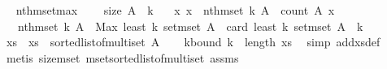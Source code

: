 \begin{isabellebody}
\isamarkupfalse%
%
\endisatagproof
{\isafoldproof}%
%
\isadelimproof
\ \isanewline
%
\endisadelimproof
\isanewline
{}\isamarkupfalse%
\ nth{\isacharunderscore}{\kern0pt}mset{\isacharunderscore}{\kern0pt}max{\isacharcolon}{\kern0pt}\ \isanewline
\ \ \ {\isachardoublequoteopen}size\ A\ {\isachargreater}{\kern0pt}\ k{\isachardoublequoteclose}\isanewline
\ \ \ {\isachardoublequoteopen}{\isasymAnd}x{\isachardot}{\kern0pt}\ x\ {\isasymle}\ nth{\isacharunderscore}{\kern0pt}mset\ k\ A\ {\isasymLongrightarrow}\ count\ A\ x\ {\isasymle}\ {}{\isachardoublequoteclose}\isanewline
\ \ \ {\isachardoublequoteopen}nth{\isacharunderscore}{\kern0pt}mset\ k\ A\ {\isacharequal}{\kern0pt}\ Max\ {\isacharparenleft}{\kern0pt}least\ {\isacharparenleft}{\kern0pt}k{\isacharplus}{\kern0pt}{}{\isacharparenright}{\kern0pt}\ {\isacharparenleft}{\kern0pt}set{\isacharunderscore}{\kern0pt}mset\ A{\isacharparenright}{\kern0pt}{\isacharparenright}{\kern0pt}{\isachardoublequoteclose}\ \ {\isachardoublequoteopen}card\ {\isacharparenleft}{\kern0pt}least\ {\isacharparenleft}{\kern0pt}k{\isacharplus}{\kern0pt}{}{\isacharparenright}{\kern0pt}\ {\isacharparenleft}{\kern0pt}set{\isacharunderscore}{\kern0pt}mset\ A{\isacharparenright}{\kern0pt}{\isacharparenright}{\kern0pt}\ {\isacharequal}{\kern0pt}\ k{\isacharplus}{\kern0pt}{}{\isachardoublequoteclose}\isanewline
%
\isadelimproof
%
\endisadelimproof
%
\isatagproof
{}\isamarkupfalse%
\ {\isacharminus}{\kern0pt}\isanewline
\ \ \isamarkupfalse%
\ xs\ \ {\isachardoublequoteopen}xs\ {\isacharequal}{\kern0pt}\ sorted{\isacharunderscore}{\kern0pt}list{\isacharunderscore}{\kern0pt}of{\isacharunderscore}{\kern0pt}multiset\ A{\isachardoublequoteclose}\isanewline
\ \ \isamarkupfalse%
\ k{\isacharunderscore}{\kern0pt}bound{\isacharcolon}{\kern0pt}\ {\isachardoublequoteopen}k\ {\isacharless}{\kern0pt}\ length\ xs{\isachardoublequoteclose}\ \isamarkupfalse%
\ {\isacharparenleft}{\kern0pt}simp\ add{\isacharcolon}{\kern0pt}xs{\isacharunderscore}{\kern0pt}def{\isacharparenright}{\kern0pt}\isanewline
\ \ \ \ \isamarkupfalse%
\ {\isacharparenleft}{\kern0pt}metis\ size{\isacharunderscore}{\kern0pt}mset\ mset{\isacharunderscore}{\kern0pt}sorted{\isacharunderscore}{\kern0pt}list{\isacharunderscore}{\kern0pt}of{\isacharunderscore}{\kern0pt}multiset\ assms{\isacharparenleft}{\kern0pt}{}{\isacharparenright}{\kern0pt}{\isacharparenright}{\kern0pt}\ \ \isanewline

\end{isabellebody}
